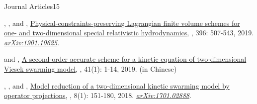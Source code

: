 \begin{cvpublicationsection}{Journal Articles}{15}
%
\item {}, , and , \href{https://doi.org/10.1016/j.jcp.2019.06.055}{Physical-constraints-preserving Lagrangian finite volume schemes for one- and two-dimensional special relativistic hydrodynamics}, , 396: 507-543, 2019. \href{https://arxiv.org/abs/1901.10625}{\em arXiv:1901.10625}.
%
\item {} and , \href{http://www.jxtu.net/xtdxxbzr/ch/reader/view_abstract.aspx?file_no=201901001&flag=1}{A second-order accurate scheme for a kinetic equation of two-dimensional Vicsek swarming model}, , 41(1): 1-14, 2019. (in Chinese)
%
\item {}, , and , \href{https://doi.org/10.4208/eajam.170617.141117a}{Model reduction of a two-dimensional kinetic swarming model by operator projections}, , 8(1): 151-180, 2018. \href{https://arxiv.org/abs/1701.02888}{\em arXiv:1701.02888}.
\end{cvpublicationsection}

